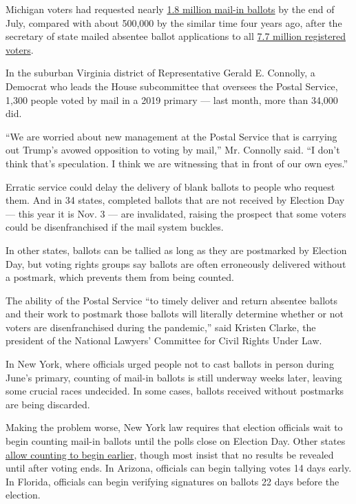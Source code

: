 Michigan voters had requested nearly
\href{https://www.michigan.gov/sos/0,4670,7-127--534590--,00.html}{1.8
million mail-in ballots} by the end of July, compared with about 500,000
by the similar time four years ago, after the secretary of state mailed
absentee ballot applications to all
\href{https://mvic.sos.state.mi.us/}{7.7 million registered voters}.

In the suburban Virginia district of Representative Gerald E. Connolly,
a Democrat who leads the House subcommittee that oversees the Postal
Service, 1,300 people voted by mail in a 2019 primary --- last month,
more than 34,000 did.

``We are worried about new management at the Postal Service that is
carrying out Trump's avowed opposition to voting by mail,'' Mr. Connolly
said. ``I don't think that's speculation. I think we are witnessing that
in front of our own eyes.''

Erratic service could delay the delivery of blank ballots to people who
request them. And in 34 states, completed ballots that are not received
by Election Day --- this year it is Nov. 3 --- are invalidated, raising
the prospect that some voters could be disenfranchised if the mail
system buckles.

In other states, ballots can be tallied as long as they are postmarked
by Election Day, but voting rights groups say ballots are often
erroneously delivered without a postmark, which prevents them from being
counted.

The ability of the Postal Service ``to timely deliver and return
absentee ballots and their work to postmark those ballots will literally
determine whether or not voters are disenfranchised during the
pandemic,'' said Kristen Clarke, the president of the National Lawyers'
Committee for Civil Rights Under Law.

In New York, where officials urged people not to cast ballots in person
during June's primary, counting of mail-in ballots is still underway
weeks later, leaving some crucial races undecided. In some cases,
ballots received without postmarks are being discarded.

Making the problem worse, New York law requires that election officials
wait to begin counting mail-in ballots until the polls close on Election
Day. Other states
\href{https://www.ncsl.org/research/elections-and-campaigns/vopp-table-16-when-absentee-mail-ballot-processing-and-counting-can-begin.aspx}{allow
counting to begin earlier}, though most insist that no results be
revealed until after voting ends. In Arizona, officials can begin
tallying votes 14 days early. In Florida, officials can begin verifying
signatures on ballots 22 days before the election.

